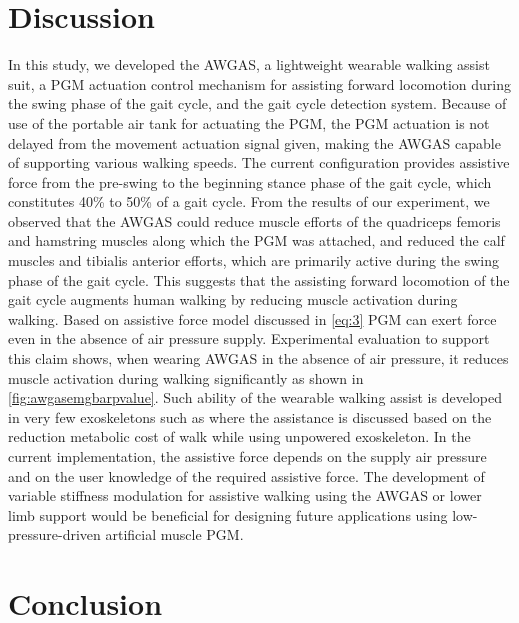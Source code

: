 \documentclass[paper,JRM,paper]{jaciiiarticle}
\begin{document}
\section{Discussion}
In this study, we developed the AWGAS, a lightweight wearable walking assist suit, a PGM actuation control mechanism for assisting forward locomotion during the swing phase of the gait cycle, and the gait cycle detection system. Because of use of the portable air tank for actuating the PGM, the PGM actuation is not delayed from the movement actuation signal given, making the AWGAS capable of supporting various walking speeds. The current configuration provides assistive force from the pre-swing to the beginning stance phase of the gait cycle, which constitutes 40\% to 50\% of a gait cycle. From the results of our experiment, we observed that the AWGAS could reduce muscle efforts of the quadriceps femoris and hamstring muscles along which the PGM was attached, and reduced the calf muscles and tibialis anterior efforts, which are primarily active during the swing phase of the gait cycle. This suggests that the assisting forward locomotion of the gait cycle augments human walking by reducing muscle activation during walking. Based on assistive force model discussed in \ref{eq:3} PGM can exert force even in the absence of air pressure supply. Experimental evaluation to support this claim shows, when wearing AWGAS in the absence of air pressure, it reduces muscle activation during walking significantly as shown in \ref{fig:awgasemgbarpvalue}. Such ability of the wearable walking assist is developed in very few exoskeletons such as \cite{22} where the assistance is discussed based on the reduction metabolic cost of walk while using unpowered exoskeleton. In the current implementation, the assistive force depends on the supply air pressure and on the user knowledge of the required assistive force. The development of variable stiffness modulation for assistive walking using the AWGAS or lower limb support would be beneficial for designing future applications using low-pressure-driven artificial muscle PGM.    

\section{Conclusion}
\end{document}
